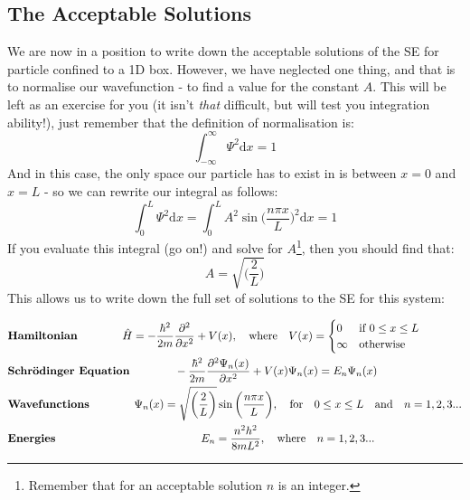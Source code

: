 \documentclass{memoir}[11pt,oneside,a4paper,openany]
\newenvironment{myblock}[1]{%
    \tcolorbox[beamer,%
    noparskip,breakable,
    colback=LightBlue,colframe=DarkBlue,%
    colbacklower=DarkBlue!75!LightBlue,%
    title=#1]}%
    {\endtcolorbox}
\newcommand{\wf}{\ensuremath{\Psi}\xspace}
\newcommand{\dd}{\ensuremath{\mathrm{d}}}
\begin{document}
\subsection{The Acceptable Solutions}
We are now in a position to write down the acceptable solutions of the SE for particle confined to a 1D box. However, we have neglected one thing, and that is to normalise our wavefunction - to find a value for the constant $A$. This will be left as an exercise for you (it isn't \emph{that} difficult, but will test you integration ability!), just remember that the definition of normalisation is:
\begin{equation}
	\int_{-\infty}^\infty \wf^2 \dd x = 1
\end{equation}
And in this case, the only space our particle has to exist in is between $x=0$ and $x=L$ - so we can rewrite our integral as follows:
\begin{equation}
	\int_0^L \wf^2 \dd x = \int_0^L A^2 \sin\bigg(\frac{n\pi x}{L}\bigg)^2 \dd x = 1
\end{equation}
If you evaluate this integral (go on!) and solve for $A$\footnote{Remember that for an acceptable solution $n$ is an integer.}, then you should find that:
\begin{equation}
	A = \sqrt{\bigg(\frac{2}{L}\bigg)}
\end{equation}
This allows us to write down the full set of solutions to the SE for this system:
\begin{myblock}{\begin{center}Particle in a 1D Box\end{center}}
	\begin{center}
		\begin{align*} & \text{\textbf{Hamiltonian}} \qquad\qquad \hat{H} = -\frac{\hbar^2}{2m}\frac{\partial^2}{\partial x^2} + V(x),\quad  \text{where} \quad V(x) = \begin{cases} 0 &\mbox{if}~ 0\leq x \leq L \\ \infty & \mbox{otherwise} \end{cases} \\
	& \text{\textbf{Schr{\"o}dinger Equation}} \qquad\qquad -\frac{\hbar^2}{2m}\frac{\partial^2\wf_n(x)}{\partial x^2} + V(x)\wf_n(x) = E_n \wf_n(x) \\
		& \text{\textbf{Wavefunctions}} \qquad\qquad \wf_n(x) = \sqrt{\bigg(\frac{2}{L}\bigg)}\sin\bigg(\frac{n\pi x}{L}\bigg), \quad \text{for} \quad 0 \leq x \leq L \quad\text{and}\quad n = 1,2,3... \\ 
		& \text{\textbf{Energies}} \qquad\qquad\qquad\qquad\qquad\qquad\quad E_n = \frac{n^2h^2}{8mL^2}, \quad \text{where} \quad n = 1,2,3...
	\end{align*}
	\end{center}
\end{myblock}
\end{document}

